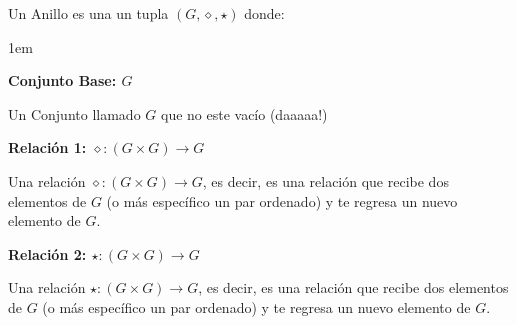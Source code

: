 \documentclass[12pt, fleqn]{report}                             %
\newenvironment{Indentation}[1][0.75em]                         %
        {\begin{adjustwidth}{#1}{}}                                 %
        {\end{adjustwidth}}                                         %
\theoremstyle{break}                                            %
\begin{document}
                Un Anillo es una un tupla $(G, \diamond, \star)$ donde:
                \begin{Indentation}[1em]
                \begin{itemize}
                \small{
                    
                    \item
                        \textbf{Conjunto Base: $G$}

                        Un Conjunto llamado $G$ que no este vacío (daaaaa!)

                    \item
                        \textbf{Relación 1: $\diamond: (G \times  G) \to G$}

                        Una relación $\diamond: (G \times  G) \to G$, es decir, es una relación
                        que recibe dos elementos de $G$ (o más específico un par ordenado) y te
                        regresa un nuevo elemento de $G$.

                    \item
                        \textbf{Relación 2: $\star: (G \times  G) \to G$}

                        Una relación $\star: (G \times  G) \to G$, es decir, es una relación
                        que recibe dos elementos de $G$ (o más específico un par ordenado) y te
                        regresa un nuevo elemento de $G$.
                }
                \end{itemize}
                \end{Indentation}
\end{document}
